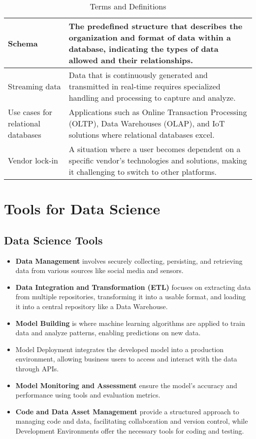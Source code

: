 \documentclass[12pt]{report} %
\begin{document}
\begin{table}[h!]
\begin{tabular}{| m{5cm} | m{10cm} |}
			\hline
			Schema & The predefined structure that describes the organization and format of data within a database, indicating the types of data allowed and their relationships. \\
			\hline
			Streaming data &  Data that is continuously generated and transmitted in real-time requires specialized handling and processing to capture and analyze. \\
			\hline
			Use cases for relational databases & Applications such as Online Transaction Processing (OLTP), Data Warehouses (OLAP), and IoT solutions where relational databases excel. \\
			\hline
			Vendor lock-in & A situation where a user becomes dependent on a specific vendor’s technologies and solutions, making it challenging to switch to other platforms. \\
			\hline
		\end{tabular}
		\caption{Terms and Definitions}
	\end{table}

		
	\chapter{Tools for Data Science}
	
	\section{Data Science Tools}
	
	\begin{itemize}
		\item  \textbf{Data Management} involves securely collecting, persisting, and retrieving data from various sources like social media and sensors.
		\item \textbf{Data Integration and Transformation (ETL)} focuses on extracting data from multiple repositories, transforming it into a usable format, and loading it into a central repository like a Data Warehouse.
		\item \textbf{Model Building} is where machine learning algorithms are applied to train data and analyze patterns, enabling predictions on new data.
		\item Model Deployment integrates the developed model into a production environment, allowing business users to access and interact with the data through APIs.
		\item \textbf{Model Monitoring and Assessment} ensure the model's accuracy and performance using tools and evaluation metrics.
		\item \textbf{Code and Data Asset Management} provide a structured approach to managing code and data, facilitating collaboration and version control, while Development Environments offer the necessary tools for coding and testing.
	\end{itemize}
\end{document}
